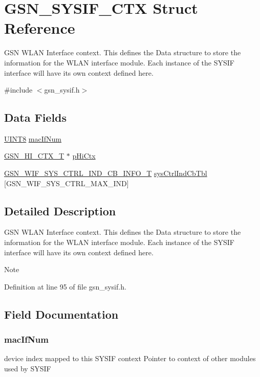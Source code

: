 \hypertarget{a00261}{
\section{GSN\_\-SYSIF\_\-CTX Struct Reference}
\label{a00261}
}


GSN WLAN Interface context. This defines the Data structure to store the information for the WLAN interface module. Each instance of the SYSIF interface will have its own context defined here.  




{\ttfamily \#include $<$gsn\_\-sysif.h$>$}

\subsection*{Data Fields}
\begin{DoxyCompactItemize}
\item 
\hyperlink{a00660_gab27e9918b538ce9d8ca692479b375b6a}{UINT8} \hyperlink{a00261_ae57ae92e651751e7978e237c55133b4c}{macIfNum}
\item 
\hyperlink{a00085}{GSN\_\-HI\_\-CTX\_\-T} $\ast$ \hyperlink{a00261_ab671e23204d79f8fda7dba9992c3d6e9}{pHiCtx}
\item 
\hyperlink{a00349}{GSN\_\-WIF\_\-SYS\_\-CTRL\_\-IND\_\-CB\_\-INFO\_\-T} \hyperlink{a00261_abcd1c853db90819acbb6f2a31aa53e8f}{sysCtrlIndCbTbl} \mbox{[}GSN\_\-WIF\_\-SYS\_\-CTRL\_\-MAX\_\-IND\mbox{]}
\end{DoxyCompactItemize}


\subsection{Detailed Description}
GSN WLAN Interface context. This defines the Data structure to store the information for the WLAN interface module. Each instance of the SYSIF interface will have its own context defined here. 

\begin{DoxyNote}{Note}

\end{DoxyNote}


Definition at line 95 of file gsn\_\-sysif.h.



\subsection{Field Documentation}
\hypertarget{a00261_ae57ae92e651751e7978e237c55133b4c}{
\subsubsection[{macIfNum}]{ {\bf macIfNum}}}
\label{a00261_ae57ae92e651751e7978e237c55133b4c}
device index mapped to this SYSIF context Pointer to context of other modules used by SYSIF 

